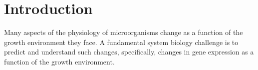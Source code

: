 \section{Introduction}
Many aspects of the physiology of microorganisms change as a function of the growth environment they face.
A fundamental system biology challenge is to predict and understand such changes, specifically, changes in gene expression as a function of the growth environment.